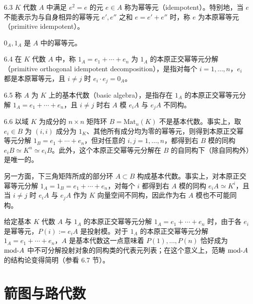 \begin{definition}{6.3}
$K$ 代数 $A$ 中满足 $e^2=e$ 的元 $e\in A$ 称为幂等元（idempotent）。特别地，当 $e$ 不能表示为与自身相异的幂等元 $e',e''$ 之和 $e=e'+e''$ 时，称 $e$ 为本原幂等元（primitive idempotent）。
\end{definition}

$0_A,1_A$ 是 $A$ 中的幂等元。

\begin{definition}{6.4}
在 $K$ 代数 $A$ 中，称 $1_A=e_1+\cdots+e_n$ 为 $1_A$ 的本原正交幂等元分解（primitive orthogonal idempotent decomposition），是指对每个 $i=1,\dots,n$，$e_i$ 都是本原幂等元，且 $i\neq j$ 时 $e_i\cdot e_j=0_A$。
\end{definition}

\begin{definition}{6.5}
称 $A$ 为 $K$ 上的基本代数（basic algebra），是指存在 $1_A$ 的本原正交幂等元分解 $1_A=e_1+\cdots+e_n$，且 $i\neq j$ 时右 $A$ 模 $e_iA$ 与 $e_jA$ 不同构。
\end{definition}

\begin{example}{6.6}
以域 $K$ 为成分的 $n\times n$ 矩阵环 $B=\mathrm{Mat}_n(K)$ 不是基本代数。事实上，取 $e_i\in B$ 为 $(i,i)$ 成分为 $1_K$、其他所有成分均为零的幂等元，则得到本原正交幂等元分解 $1_B=e_1+\cdots+e_n$，但对任意的 $i,j=1,\dots,n$，都得到右 $B$ 模的同构 $e_iB\simeq K^n\simeq e_iB$。此外，这个本原正交幂等元分解在 $B$ 的自同构下（除自同构外）是唯一的。


另一方面，下三角矩阵所成的部分环 $A\subset B$ 构成基本代数。事实上，对本原正交幂等元分解 $1_A=1_B=e_1+\cdots+e_n$，对每个 $i$ 都得到右 $A$ 模的同构 $e_iA\simeq K^i$，且当 $i\neq j$ 时 $e_iA$ 与 $e_jA$ 作为 $K$ 向量空间不同构，因此作为右 $A$ 模也不可能同构。
\end{example}

给定基本 $K$ 代数 $A$ 与 $1_A$ 的本原正交幂等元分解 $1_A=e_1+\cdots+e_n$ 时，由于各 $e_i$ 是幂等元，$P(i):=e_iA$ 是投射模。对于 $1_A$ 的本原正交幂等元分解 $1_A=e_1+\cdots+e_n$，$A$ 是基本代数这一点意味着 $P(1),\dots,P(n)$ 恰好成为 $\mathrm{mod}\text{-}A$ 中不可分解投射对象的同构类的代表元列表；在这个意义上，范畴 $\mathrm{mod}\text{-}A$ 的结构论变得简明（参看 6.7 节）。

\section{箭图与路代数}

